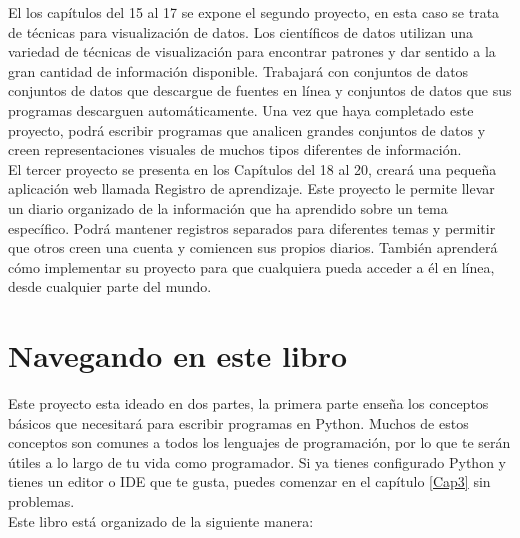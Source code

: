 El los capítulos del 15 al 17 se expone el segundo proyecto, en esta caso se trata de técnicas para visualización de datos. 
Los científicos de datos utilizan una variedad de técnicas de visualización para encontrar patrones y dar sentido a la gran cantidad de información disponible. Trabajará con conjuntos de datos conjuntos de datos que descargue de fuentes en línea y conjuntos de datos que sus programas descarguen automáticamente. Una vez que haya completado este proyecto, podrá escribir programas que analicen grandes conjuntos de datos y creen representaciones visuales de muchos tipos diferentes de información.\\

El tercer proyecto se presenta en los Capítulos del 18 al 20, creará una pequeña aplicación web llamada Registro de aprendizaje. Este proyecto le permite llevar un diario organizado de la información que ha aprendido sobre un tema específico. Podrá mantener registros separados para diferentes temas y permitir que otros creen una cuenta y comiencen sus propios diarios. También aprenderá cómo implementar su proyecto para que cualquiera pueda acceder a él en línea, desde cualquier parte del mundo.


\section*{Navegando en este libro}

Este proyecto esta ideado en dos partes, la primera parte  enseña los conceptos básicos que necesitará para escribir programas en Python. Muchos de estos conceptos son comunes a todos los lenguajes de programación, por lo que te serán útiles a lo largo de tu vida como programador. Si ya tienes configurado Python y tienes un editor o IDE que te gusta, puedes comenzar en el capítulo \ref{Cap3} sin problemas.\\

Este libro está organizado de la siguiente manera:  

